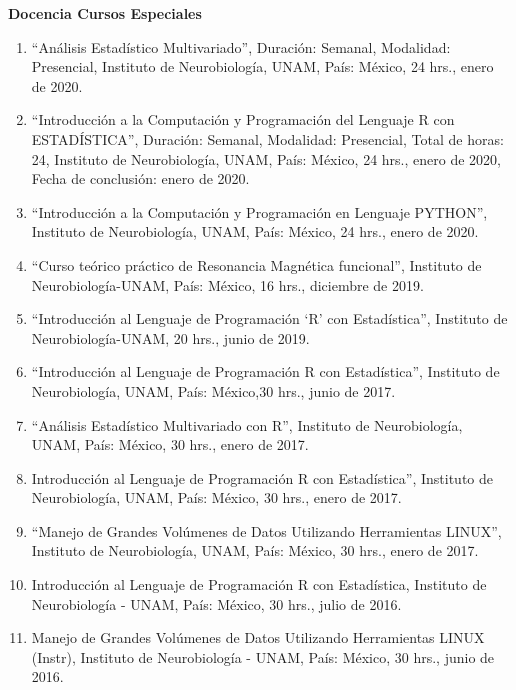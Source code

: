 \textbf{Docencia Cursos Especiales}

\hfill

\begin{enumerate}

\item “Análisis Estadístico Multivariado”, Duración: Semanal, Modalidad: Presencial, Instituto de Neurobiología, UNAM, País: México, 24 hrs., enero de 2020.

\item “Introducción a la Computación y Programación del Lenguaje R con ESTADÍSTICA”, Duración: Semanal, Modalidad: Presencial, Total de horas: 24, Instituto de Neurobiología, UNAM, País: México, 24 hrs., enero de 2020, 
Fecha de conclusión: enero de 2020.

\item “Introducción a la Computación y Programación en Lenguaje PYTHON”, Instituto de Neurobiología, UNAM, País: México, 24 hrs., enero de 2020.

\item “Curso teórico práctico de Resonancia Magnética funcional”, Instituto de Neurobiología-UNAM, País: México, 16 hrs., diciembre de 2019.

\item “Introducción al Lenguaje de Programación ‘R’ con Estadística”, Instituto de Neurobiología-UNAM, 20  hrs., junio de 2019.

\item “Introducción al Lenguaje de Programación R con Estadística”, Instituto de Neurobiología, UNAM, País: México,30 hrs.,  junio de 2017.

\item “Análisis Estadístico Multivariado con R”, Instituto de Neurobiología, UNAM, País: México, 30 hrs., enero de 
2017.

\item Introducción al Lenguaje de Programación R con Estadística”, Instituto de Neurobiología, UNAM, País: México, 30 hrs., enero de 2017.

\item “Manejo de Grandes Volúmenes de Datos Utilizando Herramientas LINUX”, Instituto de Neurobiología, UNAM, País: México, 30 hrs., enero de 2017.

\item Introducción al Lenguaje de Programación R con Estadística, Instituto de Neurobiología - UNAM, País: México, 30 hrs., julio de 2016.

\item Manejo de Grandes Volúmenes de Datos Utilizando Herramientas LINUX (Instr), Instituto de Neurobiología - UNAM, País: México, 30 hrs., junio de 2016.


\end{enumerate}
